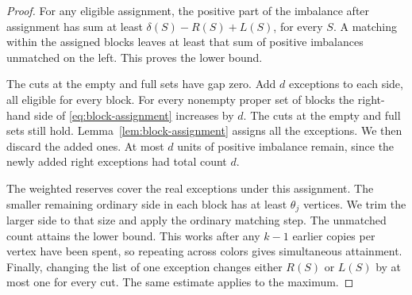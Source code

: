 \begin{proof}
For any eligible assignment, the positive part of the imbalance after assignment has sum at least \(\delta(S)-R(S)+L(S)\), for every \(S\). A matching within the assigned blocks leaves at least that sum of positive imbalances unmatched on the left. This proves the lower bound.

The cuts at the empty and full sets have gap zero. Add \(d\) exceptions to each side, all eligible for every block. For every nonempty proper set of blocks the right-hand side of \eqref{eq:block-assignment} increases by \(d\). The cuts at the empty and full sets still hold. Lemma~\ref{lem:block-assignment} assigns all the exceptions. We then discard the added ones. At most \(d\) units of positive imbalance remain, since the newly added right exceptions had total count \(d\).

The weighted reserves cover the real exceptions under this assignment. The smaller remaining ordinary side in each block has at least \(\theta_j\) vertices. We trim the larger side to that size and apply the ordinary matching step. The unmatched count attains the lower bound. This works after any \(k-1\) earlier copies per vertex have been spent, so repeating across colors gives simultaneous attainment. Finally, changing the list of one exception changes either \(R(S)\) or \(L(S)\) by at most one for every cut. The same estimate applies to the maximum.
\end{proof}
